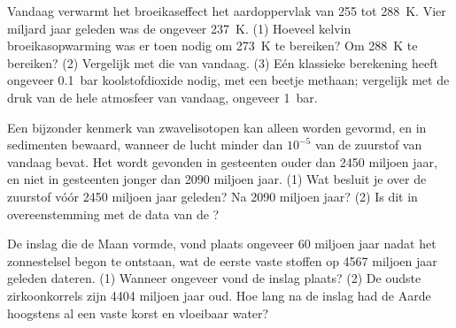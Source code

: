 \begin{exercise}[$\star\star\star$]\label{exo:g12:early-earth:13}
Vandaag verwarmt het broeikaseffect het aardoppervlak van 255 tot
\qty{288}{K}. Vier miljard jaar geleden was de  ongeveer
\qty{237}{K}. (1) Hoeveel kelvin broeikasopwarming was er toen nodig
om \qty{273}{K} te bereiken? Om \qty{288}{K} te bereiken? (2) Vergelijk met die van vandaag.
(3) Eén klassieke berekening heeft ongeveer \qty{0.1}{bar} koolstofdioxide nodig,
met een beetje methaan; vergelijk met de druk van de hele atmosfeer van vandaag,
ongeveer \qty{1}{bar}.
\end{exercise}

\begin{exercise}[$\star\star\star$]\label{exo:g12:early-earth:14}
Een bijzonder kenmerk van zwavelisotopen kan alleen worden gevormd, en in
sedimenten bewaard, wanneer de lucht minder dan $10^{-5}$ van de zuurstof van vandaag bevat. Het
wordt gevonden in gesteenten ouder dan 2450 miljoen jaar, en niet in gesteenten jonger dan
2090 miljoen jaar. (1) Wat besluit je over de zuurstof vóór 2450
miljoen jaar geleden? Na 2090 miljoen jaar? (2) Is dit in overeenstemming met de
data van de ?
\end{exercise}

\begin{exercise}[$\star\star\star$]\label{exo:g12:early-earth:15}
De inslag die de Maan vormde, vond plaats ongeveer 60 miljoen jaar nadat het
zonnestelsel begon te ontstaan, wat de eerste vaste stoffen op 4567 miljoen jaar geleden dateren.
(1) Wanneer ongeveer vond de inslag plaats? (2) De oudste zirkoonkorrels zijn \num{4404}
miljoen jaar oud. Hoe lang na de inslag had de Aarde hoogstens al
een vaste korst en vloeibaar water?
\end{exercise}

